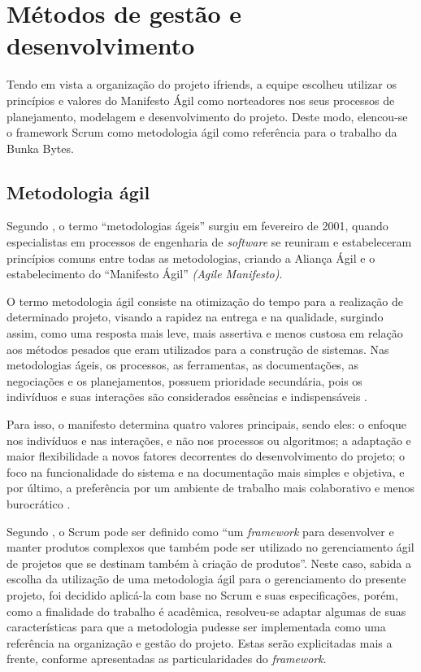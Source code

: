 \section{Métodos de gestão e desenvolvimento}
\label{metodologia agil}
Tendo em vista a organização do projeto \gls{ifriends}, a equipe escolheu utilizar os princípios e valores do Manifesto Ágil como norteadores nos seus processos de planejamento, modelagem e desenvolvimento do projeto. Deste modo, elencou-se  o \gls{framework} Scrum como metodologia ágil como referência para o trabalho da Bunka Bytes.

\subsection{Metodologia ágil}
Segundo , o termo “metodologias ágeis” surgiu em fevereiro de 2001, quando  especialistas em processos de engenharia de \textsl{software} se reuniram e estabeleceram princípios comuns entre todas as metodologias, criando a Aliança Ágil e o estabelecimento do ``Manifesto Ágil'' \textsl{(Agile Manifesto)}.

O termo metodologia ágil consiste na otimização do tempo para a realização de determinado projeto, visando a rapidez na entrega e na qualidade, surgindo assim, como uma resposta mais leve, mais assertiva e menos custosa em relação aos métodos pesados que eram utilizados para a construção de sistemas. Nas metodologias ágeis, os processos, as ferramentas, as documentações, as negociações e os planejamentos, possuem prioridade secundária, pois os indivíduos e suas interações são considerados essências e indispensáveis \cite{sganderla2016aprimorando}.

Para isso, o manifesto determina quatro valores principais, sendo eles: o enfoque nos indivíduos e nas interações, e não nos processos ou algoritmos; a adaptação e maior flexibilidade a novos fatores decorrentes do desenvolvimento do projeto; o foco na funcionalidade do sistema e na documentação mais simples e objetiva, e por último, a preferência por um ambiente de trabalho mais colaborativo e menos burocrático  \cite{sganderla2016aprimorando}. 

Segundo , o Scrum pode ser definido como ``um \textsl{\gls{framework}} para desenvolver e manter produtos complexos que também pode ser utilizado no gerenciamento ágil de projetos que se destinam também à criação de produtos''. Neste caso, sabida a escolha da utilização de uma metodologia ágil para o gerenciamento do presente projeto, foi decidido aplicá-la com base no Scrum e suas especificações, porém, como a finalidade do trabalho é acadêmica, resolveu-se adaptar algumas de suas características para que a metodologia pudesse ser implementada como uma referência na organização e gestão do projeto. Estas serão explicitadas mais a frente, conforme apresentadas as particularidades do \textsl{\gls{framework}}.

